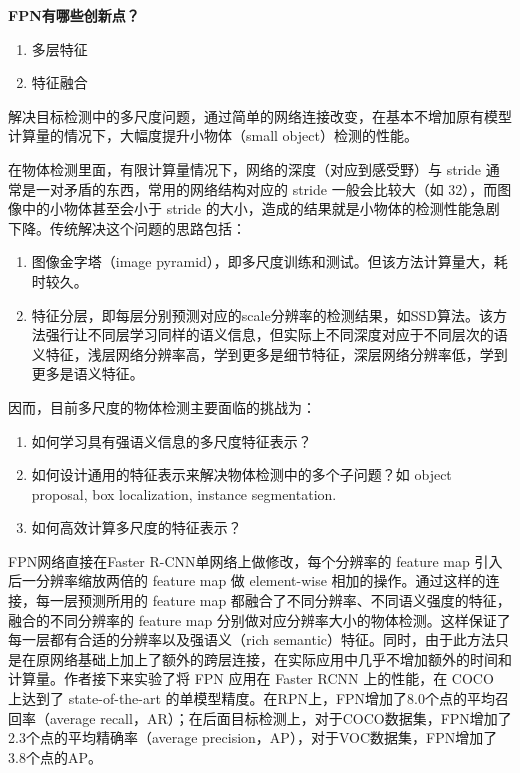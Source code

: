 \textbf{FPN有哪些创新点？}

\begin{enumerate}
\def\labelenumi{\arabic{enumi}.}
\item
  多层特征
\item
  特征融合
\end{enumerate}

解决目标检测中的多尺度问题，通过简单的网络连接改变，在基本不增加原有模型计算量的情况下，大幅度提升小物体（small
object）检测的性能。

在物体检测里面，有限计算量情况下，网络的深度（对应到感受野）与 stride
通常是一对矛盾的东西，常用的网络结构对应的 stride 一般会比较大（如
32），而图像中的小物体甚至会小于 stride
的大小，造成的结果就是小物体的检测性能急剧下降。传统解决这个问题的思路包括：

\begin{enumerate}
\def\labelenumi{\arabic{enumi}.}
\item
  图像金字塔（image
  pyramid），即多尺度训练和测试。但该方法计算量大，耗时较久。
\item
  特征分层，即每层分别预测对应的scale分辨率的检测结果，如SSD算法。该方法强行让不同层学习同样的语义信息，但实际上不同深度对应于不同层次的语义特征，浅层网络分辨率高，学到更多是细节特征，深层网络分辨率低，学到更多是语义特征。
\end{enumerate}

因而，目前多尺度的物体检测主要面临的挑战为：

\begin{enumerate}
\def\labelenumi{\arabic{enumi}.}
\item
  如何学习具有强语义信息的多尺度特征表示？
\item
  如何设计通用的特征表示来解决物体检测中的多个子问题？如 object
  proposal, box localization, instance segmentation.
\item
  如何高效计算多尺度的特征表示？
\end{enumerate}

FPN网络直接在Faster R-CNN单网络上做修改，每个分辨率的 feature map
引入后一分辨率缩放两倍的 feature map 做 element-wise
相加的操作。通过这样的连接，每一层预测所用的 feature map
都融合了不同分辨率、不同语义强度的特征，融合的不同分辨率的 feature map
分别做对应分辨率大小的物体检测。这样保证了每一层都有合适的分辨率以及强语义（rich
semantic）特征。同时，由于此方法只是在原网络基础上加上了额外的跨层连接，在实际应用中几乎不增加额外的时间和计算量。作者接下来实验了将
FPN 应用在 Faster RCNN 上的性能，在 COCO 上达到了 state-of-the-art
的单模型精度。在RPN上，FPN增加了8.0个点的平均召回率（average
recall，AR）；在后面目标检测上，对于COCO数据集，FPN增加了2.3个点的平均精确率（average
precision，AP），对于VOC数据集，FPN增加了3.8个点的AP。

